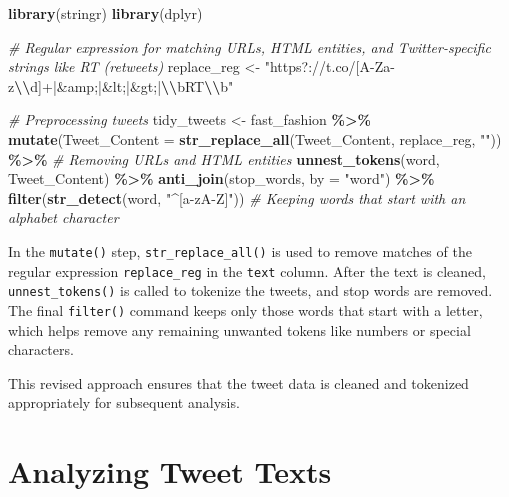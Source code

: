 \documentclass[
]{book}
\newenvironment{Shaded}{\begin{snugshade}}{\end{snugshade}}
\newcommand{\AttributeTok}[1]{\textcolor[rgb]{0.13,0.29,0.53}{#1}}
\newcommand{\CommentTok}[1]{\textcolor[rgb]{0.56,0.35,0.01}{\textit{#1}}}
\newcommand{\FunctionTok}[1]{\textcolor[rgb]{0.13,0.29,0.53}{\textbf{#1}}}
\newcommand{\NormalTok}[1]{#1}
\newcommand{\OtherTok}[1]{\textcolor[rgb]{0.56,0.35,0.01}{#1}}
\newcommand{\SpecialCharTok}[1]{\textcolor[rgb]{0.81,0.36,0.00}{\textbf{#1}}}
\newcommand{\StringTok}[1]{\textcolor[rgb]{0.31,0.60,0.02}{#1}}
\begin{document}
\begin{Shaded}
\begin{Highlighting}[]
\FunctionTok{library}\NormalTok{(stringr)}
\FunctionTok{library}\NormalTok{(dplyr)}

\CommentTok{\# Regular expression for matching URLs, HTML entities, and Twitter{-}specific strings like RT (retweets)}
\NormalTok{replace\_reg }\OtherTok{\textless{}{-}} \StringTok{"https?://t.co/[A{-}Za{-}z}\SpecialCharTok{\textbackslash{}\textbackslash{}}\StringTok{d]+|\&amp;|\&lt;|\&gt;|}\SpecialCharTok{\textbackslash{}\textbackslash{}}\StringTok{bRT}\SpecialCharTok{\textbackslash{}\textbackslash{}}\StringTok{b"}

\CommentTok{\# Preprocessing tweets}
\NormalTok{tidy\_tweets }\OtherTok{\textless{}{-}}\NormalTok{ fast\_fashion }\SpecialCharTok{\%\textgreater{}\%}
  \FunctionTok{mutate}\NormalTok{(}\AttributeTok{Tweet\_Content =} \FunctionTok{str\_replace\_all}\NormalTok{(Tweet\_Content, replace\_reg, }\StringTok{""}\NormalTok{)) }\SpecialCharTok{\%\textgreater{}\%}  \CommentTok{\# Removing URLs and HTML entities}
  \FunctionTok{unnest\_tokens}\NormalTok{(word, Tweet\_Content) }\SpecialCharTok{\%\textgreater{}\%}
  \FunctionTok{anti\_join}\NormalTok{(stop\_words, }\AttributeTok{by =} \StringTok{"word"}\NormalTok{) }\SpecialCharTok{\%\textgreater{}\%}
  \FunctionTok{filter}\NormalTok{(}\FunctionTok{str\_detect}\NormalTok{(word, }\StringTok{"\^{}[a{-}zA{-}Z]"}\NormalTok{))  }\CommentTok{\# Keeping words that start with an alphabet character}
\end{Highlighting}
\end{Shaded}

In the \texttt{mutate()} step, \texttt{str\_replace\_all()} is used to remove matches of the regular expression \texttt{replace\_reg} in the \texttt{text} column. After the text is cleaned, \texttt{unnest\_tokens()} is called to tokenize the tweets, and stop words are removed. The final \texttt{filter()} command keeps only those words that start with a letter, which helps remove any remaining unwanted tokens like numbers or special characters.

This revised approach ensures that the tweet data is cleaned and tokenized appropriately for subsequent analysis.

\hypertarget{analyzing-tweet-texts}{%
\section{Analyzing Tweet Texts}\label{analyzing-tweet-texts}}
\end{document}
